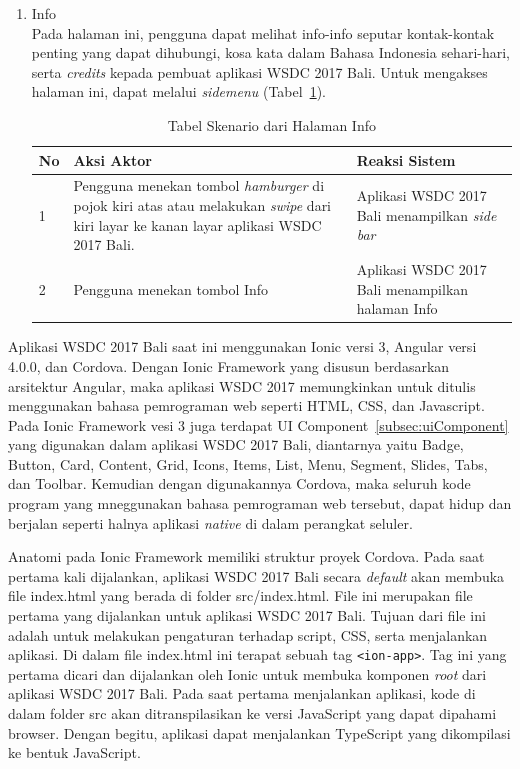 \begin{enumerate}
	\item Info \\
	Pada halaman ini, pengguna dapat melihat info-info seputar kontak-kontak penting yang dapat dihubungi, kosa kata dalam Bahasa Indonesia sehari-hari, serta {\it credits} kepada pembuat aplikasi WSDC 2017 Bali. Untuk mengakses halaman ini, dapat melalui \textit{sidemenu} (Tabel~\ref{table:skenarioHalamanInfo}).
		\begin{table}[H]
			\centering
			\caption{Tabel Skenario dari Halaman Info}
			\begin{tabular}{|p{0.5cm}|p{7cm}|p{7cm}|}
				\hline
				No & Aksi Aktor                               & Reaksi Sistem                                          \\ \hline
				1  & Pengguna menekan tombol {\it hamburger} di pojok kiri atas atau melakukan \textit{swipe} dari kiri layar ke kanan layar aplikasi WSDC 2017 Bali. & Aplikasi WSDC 2017 Bali menampilkan {\it side bar} \\ \hline
				2  & Pengguna menekan tombol Info & Aplikasi WSDC 2017 Bali menampilkan halaman Info \\ \hline
			\end{tabular}
			\label{table:skenarioHalamanInfo}
		\end{table}
\end{enumerate}

Aplikasi WSDC 2017 Bali saat ini menggunakan Ionic versi 3, Angular versi 4.0.0, dan Cordova. Dengan Ionic Framework yang disusun berdasarkan arsitektur Angular, maka aplikasi WSDC 2017 memungkinkan untuk ditulis menggunakan bahasa pemrograman web seperti HTML, CSS, dan Javascript. Pada Ionic Framework vesi 3 juga terdapat UI Component~\ref{subsec:uiComponent} yang digunakan dalam aplikasi WSDC 2017 Bali, diantarnya yaitu Badge, Button, Card, Content, Grid, Icons, Items, List, Menu, Segment, Slides, Tabs, dan Toolbar. Kemudian dengan digunakannya Cordova, maka seluruh kode program yang mneggunakan bahasa pemrograman web tersebut, dapat hidup dan berjalan seperti halnya aplikasi \textit{native} di dalam perangkat seluler.

Anatomi pada Ionic Framework memiliki struktur proyek Cordova. Pada saat pertama kali dijalankan, aplikasi WSDC 2017 Bali secara \textit{default} akan membuka file index.html yang berada di folder src/index.html. File ini merupakan file pertama yang dijalankan untuk aplikasi WSDC 2017 Bali. Tujuan dari file ini adalah untuk melakukan pengaturan terhadap script, CSS, serta menjalankan aplikasi. Di dalam file index.html ini terapat sebuah tag \texttt{<ion-app>}. Tag ini yang pertama dicari dan dijalankan oleh Ionic untuk  membuka komponen \textit{root} dari aplikasi WSDC 2017 Bali. Pada saat pertama menjalankan aplikasi, kode di dalam folder src akan ditranspilasikan ke versi JavaScript yang dapat dipahami browser. Dengan begitu, aplikasi dapat menjalankan TypeScript yang dikompilasi ke bentuk JavaScript.

